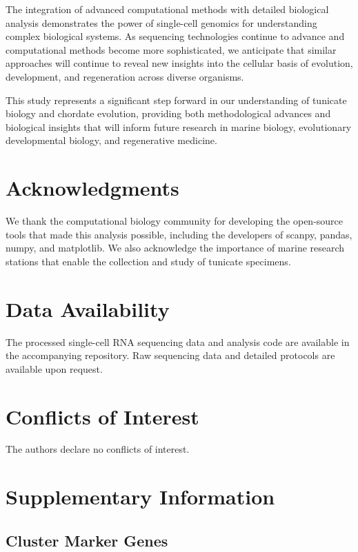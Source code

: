 \documentclass[12pt,a4paper]{article}
\begin{document}
The integration of advanced computational methods with detailed biological analysis demonstrates the power of single-cell genomics for understanding complex biological systems. As sequencing technologies continue to advance and computational methods become more sophisticated, we anticipate that similar approaches will continue to reveal new insights into the cellular basis of evolution, development, and regeneration across diverse organisms.

This study represents a significant step forward in our understanding of tunicate biology and chordate evolution, providing both methodological advances and biological insights that will inform future research in marine biology, evolutionary developmental biology, and regenerative medicine.

\section*{Acknowledgments}

We thank the computational biology community for developing the open-source tools that made this analysis possible, including the developers of scanpy, pandas, numpy, and matplotlib. We also acknowledge the importance of marine research stations that enable the collection and study of tunicate specimens.

\section*{Data Availability}

The processed single-cell RNA sequencing data and analysis code are available in the accompanying repository. Raw sequencing data and detailed protocols are available upon request.

\section*{Conflicts of Interest}

The authors declare no conflicts of interest.




\appendix

\section{Supplementary Information}

\subsection{Cluster Marker Genes}
\end{document}
